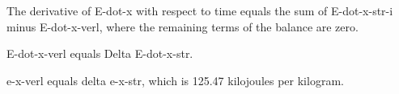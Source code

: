 The derivative of E-dot-x with respect to time equals the sum of E-dot-x-str-i minus E-dot-x-verl, where the remaining terms of the balance are zero.

E-dot-x-verl equals Delta E-dot-x-str.

e-x-verl equals delta e-x-str, which is 125.47 kilojoules per kilogram.